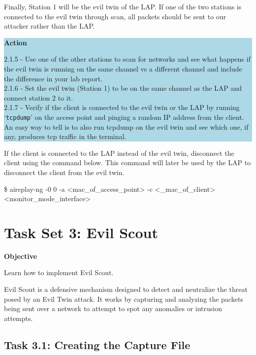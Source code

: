 \documentclass[letterpaper,12pt]{report}
\begin{document}
Finally, Station 1 will be the evil twin of the LAP. If one of the two stations is connected to the evil twin through scan, all packets should be sent to our attacker rather than the LAP.

\colorbox{lightblue}{%
\parbox{\dimexpr\linewidth-2\fboxsep}{%
\textbf{Action}

2.1.5 - Use one of the other stations to scan for networks and see what happens if the evil twin is running on the same channel vs a different channel and include the difference in your lab report.\\  
2.1.6 - Set the evil twin (Station 1) to be on the same channel as the LAP and connect station 2 to it.\\ 
2.1.7 - Verify if the client is connected to the evil twin or the LAP by running `\texttt{tcpdump}' on the access point and pinging a random IP address from the client. An easy way to tell is to also run tcpdump on the evil twin and see which one, if any, produces tcp traffic in the terminal.
    }%
}%

If the client is connected to the LAP instead of the evil twin, disconnect the client using the command below. This command will later be used by the LAP to disconnect the client from the evil twin. 
\bigskip
\begin{mdframed}
[backgroundcolor=black!10,style=code,nobreak=true,align=center,userdefinedwidth=14cm]
\$ aireplay-ng -0 0 -a <mac\_of\_access\_point> -c <\_mac\_of\_client> <monitor\_mode\_interface>
\end{mdframed}


\section*{Task Set 3: Evil Scout}\label{sec:Task 3: Evil Scout}

\textbf{Objective}

Learn how to implement Evil Scout.

\bigskip

Evil Scout is a defensive mechanism designed to detect and neutralize the threat posed by an Evil Twin attack. It works by capturing and analyzing the packets being sent over a network to attempt to spot any anomalies or intrusion attempts.

\subsection*{Task 3.1: Creating the Capture File}\label{sec:Task-3.1-Creating-the-Capture-File}
\end{document}
